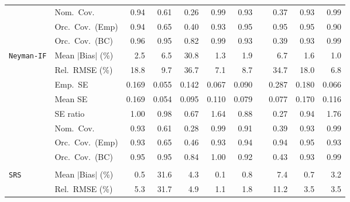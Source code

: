 \begin{landscape}
\begin{longtable}{llrrrrrrrrr}
 & Nom.\ Cov. & \cellcolor{rankone}0.94 & 0.61 & 0.26 & \cellcolor{rankthree}0.99 & \cellcolor{ranktwo}0.93 &  & 0.37 & \cellcolor{ranktwo}0.93 & \cellcolor{rankthree}0.99 \\
 & Orc.\ Cov.\ (Emp) & \cellcolor{ranktwo}0.94 & 0.65 & 0.40 & \cellcolor{rankthree}0.93 & \cellcolor{rankone}0.95 &  & \cellcolor{rankone}0.95 & \cellcolor{rankone}0.95 & 0.90 \\
 & Orc.\ Cov.\ (BC) & \cellcolor{ranktwo}0.96 & \cellcolor{rankone}0.95 & 0.82 & 0.99 & \cellcolor{rankthree}0.93 &  & 0.39 & \cellcolor{rankthree}0.93 & 0.99 \\
\addlinespace[2pt]
\quad \texttt{Neyman-IF} & Mean $|$Bias$|$ (\%) & 2.5 & 6.5 & 30.8 & \cellcolor{ranktwo}1.3 & 1.9 &  & 6.7 & \cellcolor{rankthree}1.6 & \cellcolor{rankone}1.0 \\
 & Rel.\ RMSE (\%) & 18.8 & 9.7 & 36.7 & \cellcolor{ranktwo}7.1 & \cellcolor{rankthree}8.7 &  & 34.7 & 18.0 & \cellcolor{rankone}6.8 \\
 & Emp.\ SE & 0.169 & 0.055 & 0.142 & 0.067 & 0.090 &  & 0.287 & 0.180 & 0.066 \\
 & Mean SE & 0.169 & 0.054 & 0.095 & 0.110 & 0.079 &  & 0.077 & 0.170 & 0.116 \\
 & SE ratio & \cellcolor{rankone}1.00 & \cellcolor{ranktwo}0.98 & 0.67 & 1.64 & 0.88 &  & 0.27 & \cellcolor{rankthree}0.94 & 1.76 \\
 & Nom.\ Cov. & \cellcolor{rankone}0.93 & \cellcolor{rankthree}0.61 & 0.28 & \cellcolor{ranktwo}0.99 & \cellcolor{ranktwo}0.91 &  & 0.39 & \cellcolor{rankone}0.93 & \cellcolor{ranktwo}0.99 \\
 & Orc.\ Cov.\ (Emp) & \cellcolor{rankthree}0.93 & 0.65 & 0.46 & \cellcolor{rankthree}0.93 & \cellcolor{ranktwo}0.94 &  & \cellcolor{ranktwo}0.94 & \cellcolor{rankone}0.95 & \cellcolor{rankthree}0.93 \\
 & Orc.\ Cov.\ (BC) & \cellcolor{rankone}0.95 & \cellcolor{rankone}0.95 & 0.84 & 1.00 & \cellcolor{rankthree}0.92 &  & 0.43 & \cellcolor{ranktwo}0.93 & 0.99 \\
\addlinespace[2pt]
\multicolumn{11}{l}{\textbf{Continuous Phase-One Covariates}} \\
\addlinespace[2pt]
\quad \texttt{SRS} & Mean $|$Bias$|$ (\%) & \cellcolor{ranktwo}0.5 & 31.6 & 4.3 & \cellcolor{rankone}0.1 & 0.8 &  & 7.4 & \cellcolor{rankthree}0.7 & 3.2 \\
 & Rel.\ RMSE (\%) & 5.3 & 31.7 & 4.9 & \cellcolor{rankone}1.1 & \cellcolor{ranktwo}1.8 &  & 11.2 & \cellcolor{rankthree}3.5 & \cellcolor{rankthree}3.5 \\

\end{longtable}
\end{landscape}
